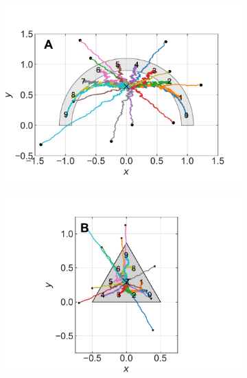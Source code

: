 \documentclass[11pt,twocolumn,twoside]{opticajnl}
\begin{document}
\begin{figure}[h]
    \centering
        \begin{subfigure}[b]{\linewidth}
            \centering
            \includegraphics[width=\textwidth]{Figuras/sc_pesos_sigma_0.1_epochs_100000_lr_0.01_disp.pdf}
            \end{subfigure}
         \begin{subfigure}[b]{\linewidth}
            \centering
            \includegraphics[width=\textwidth]{Figuras/tri_pesos_sigma_0.1_epochs_100000_lr_0.01_disp.pdf}
         \end{subfigure}
         \begin{subfigure}[b]{\linewidth}
            \centering

\end{subfigure}
\end{figure}
\end{document}
